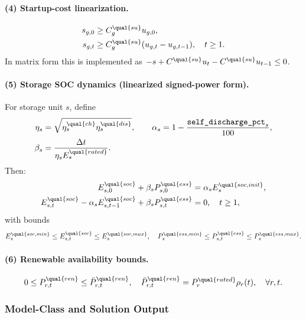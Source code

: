 \paragraph{(4) Startup-cost linearization.}
\begin{align}
s_{g,0} &\ge C_g^{\qual{su}} u_{g,0}, \\
s_{g,t} &\ge C_g^{\qual{su}}(u_{g,t}-u_{g,t-1}), \quad t\ge 1.
\label{eq:uc-startup-impl}
\end{align}
In matrix form this is implemented as
\(-s + C^{\qual{su}}u_t - C^{\qual{su}}u_{t-1} \le 0\).

\paragraph{(5) Storage SOC dynamics (linearized signed-power form).}
For storage unit \(s\), define
\begin{align}
\eta_s &= \sqrt{\eta_s^{\qual{ch}}\eta_s^{\qual{dis}}},
\qquad
\alpha_s = 1 - \frac{\texttt{self\_discharge\_pct}_s}{100}, \\
\beta_s &= \frac{\Delta t}{\eta_s E_s^{\qual{rated}}}.
\end{align}
Then:
\begin{align}
E_{s,0}^{\qual{soc}} + \beta_s P^{\qual{ess}}_{s,0} &= \alpha_s E_{s}^{\qual{soc,init}}, \\
E_{s,t}^{\qual{soc}} - \alpha_s E_{s,t-1}^{\qual{soc}} + \beta_s P^{\qual{ess}}_{s,t} &= 0,
\quad t\ge 1,
\label{eq:uc-soc-impl}
\end{align}
with bounds
\begin{align}
E_s^{\qual{soc,min}} \le E_{s,t}^{\qual{soc}} \le E_s^{\qual{soc,max}},
\quad
P_s^{\qual{ess,min}} \le P_{s,t}^{\qual{ess}} \le P_s^{\qual{ess,max}}.
\label{eq:uc-soc-bounds-impl}
\end{align}

\paragraph{(6) Renewable availability bounds.}
\begin{align}
0 \le P_{r,t}^{\qual{ren}} \le \bar P_{r,t}^{\qual{ren}},
\quad
\bar P_{r,t}^{\qual{ren}} = P_r^{\qual{rated}}\rho_r(t),
\quad \forall r,t.
\label{eq:uc-ren-bounds-impl}
\end{align}

\subsubsection{Model-Class and Solution Output}

